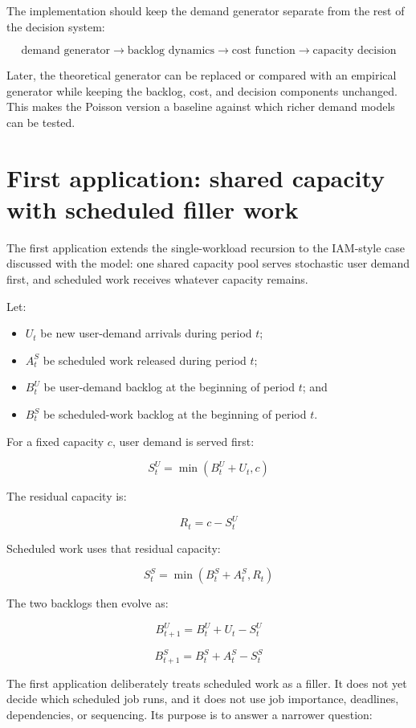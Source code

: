 \documentclass[11pt,a4paper]{article}
\newcommand{\equationnote}[1]{\begin{center}\colorbox{boxblue}{\parbox{0.92\linewidth}{\begin{equation*}#1\end{equation*}}}\end{center}}
\begin{document}
The implementation should keep the demand generator separate from the rest of the decision system:

\equationnote{\text{demand generator} \rightarrow \text{backlog dynamics} \rightarrow \text{cost function} \rightarrow \text{capacity decision}}

Later, the theoretical generator can be replaced or compared with an empirical generator while keeping the backlog, cost, and decision components unchanged. This makes the Poisson version a baseline against which richer demand models can be tested.

\clearpage
\section{First application: shared capacity with scheduled filler work}

The first application extends the single-workload recursion to the IAM-style
case discussed with the model: one shared capacity pool serves stochastic user
demand first, and scheduled work receives whatever capacity remains.

Let:

\begin{itemize}
  \item $U_t$ be new user-demand arrivals during period $t$;
  \item $A^S_t$ be scheduled work released during period $t$;
  \item $B^U_t$ be user-demand backlog at the beginning of period $t$; and
  \item $B^S_t$ be scheduled-work backlog at the beginning of period $t$.
\end{itemize}

For a fixed capacity $c$, user demand is served first:

\equationnote{S^U_t = \min(B^U_t + U_t, c)}

The residual capacity is:

\equationnote{R_t = c - S^U_t}

Scheduled work uses that residual capacity:

\equationnote{S^S_t = \min(B^S_t + A^S_t, R_t)}

The two backlogs then evolve as:

\equationnote{B^U_{t+1} = B^U_t + U_t - S^U_t}

\equationnote{B^S_{t+1} = B^S_t + A^S_t - S^S_t}

The first application deliberately treats scheduled work as a filler. It does
not yet decide which scheduled job runs, and it does not use job importance,
deadlines, dependencies, or sequencing. Its purpose is to answer a narrower
question:
\end{document}
